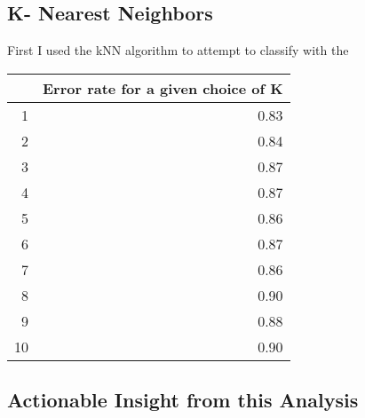 \documentclass{article}
\begin{document}
\subsection{K- Nearest Neighbors}

First I used the kNN algorithm to attempt to classify with the 
\begin{table}[ht]
\begin{center}
\begin{tabular}{rr}
  \hline
 & Error rate for a given choice of K \\ 
  \hline
1 & 0.83 \\ 
  2 & 0.84 \\ 
  3 & 0.87 \\ 
  4 & 0.87 \\ 
  5 & 0.86 \\ 
  6 & 0.87 \\ 
  7 & 0.86 \\ 
  8 & 0.90 \\ 
  9 & 0.88 \\ 
  10 & 0.90 \\ 
   \hline
\end{tabular}
\end{center}
\end{table}
\subsection{Actionable Insight from this Analysis}
\end{document}
